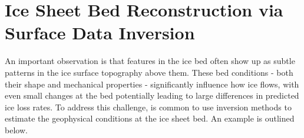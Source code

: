 



\section*{Ice Sheet Bed Reconstruction via Surface Data Inversion}\label{Ockenden_2022}

An important observation is that features in the ice bed often show up as subtle patterns in the ice surface topography above them\cite{Ockenden_2022}. These bed conditions - both their shape and mechanical properties - significantly influence how ice flows, with even small changes at the bed potentially leading to large differences in predicted ice loss rates. To address this challenge, is common to use inversion methods to estimate the geophysical conditions at the ice sheet bed. An example is outlined below.

